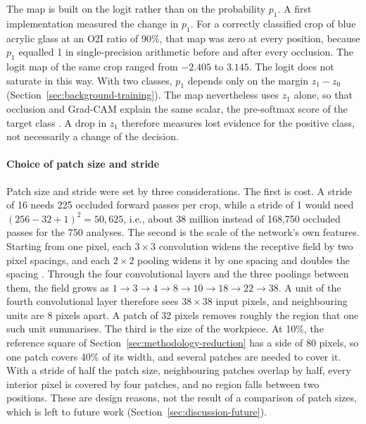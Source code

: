 The map is built on the logit rather than on the probability $p_1$. A first
implementation measured the change in $p_1$. For a correctly classified crop of blue
acrylic glass at an O2I ratio of 90\%, that map was zero at every position, because
$p_1$ equalled 1 in single-precision arithmetic before and after every occlusion. The
logit map of the same crop ranged from $-2.405$ to $3.145$. The logit does not
saturate in this way. With two classes, $p_1$ depends only on the margin
$z_1 - z_0$ (Section~\ref{sec:background-training}). The map nevertheless uses $z_1$
alone, so that occlusion and Grad-CAM explain the same scalar, the pre-softmax score
of the target class \citep{selvaraju2017gradcam}. A drop in $z_1$ therefore measures
lost evidence for the positive class, not necessarily a change of the decision.

\paragraph{Choice of patch size and stride}
\label{sec:methodology-patch}
Patch size and stride were set by three considerations. The first is cost. A stride
of 16 needs 225 occluded forward passes per crop, while a stride of 1 would need
$(256 - 32 + 1)^2 = 50{,}625$, i.e., about 38 million instead of 168,750 occluded
passes for the 750 analyses. The second is the scale of the network's own features. Starting
from one pixel, each $3 \times 3$ convolution widens the receptive field by two pixel
spacings, and each $2 \times 2$ pooling widens it by one spacing and doubles the
spacing \citep{araujo2019computing}. Through the four convolutional layers and the
three poolings between them, the field grows as
$1 \to 3 \to 4 \to 8 \to 10 \to 18 \to 22 \to 38$. A unit of the fourth convolutional
layer therefore sees $38 \times 38$ input pixels, and neighbouring units are 8 pixels
apart. A patch of 32 pixels removes roughly the region that one such unit summarises.
The third is the size of the workpiece. At 10\%, the reference square of
Section~\ref{sec:methodology-reduction} has a side of 80 pixels, so one patch covers
40\% of its width, and several patches are needed to cover it. With a stride of half
the patch size, neighbouring patches overlap by half, every interior pixel is covered
by four patches, and no region falls between two positions. These are design reasons,
not the result of a comparison of patch sizes, which is left to future work
(Section~\ref{sec:discussion-future}).

